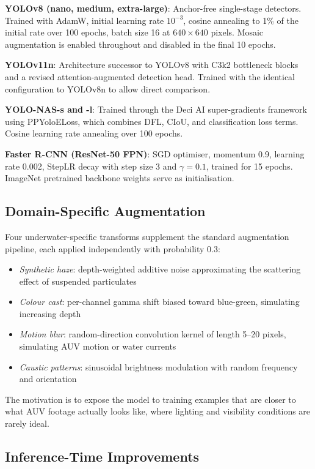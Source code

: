 \documentclass[conference]{IEEEtran}
\begin{document}
\textbf{YOLOv8 (nano, medium, extra-large)}: Anchor-free single-stage
detectors. Trained with AdamW, initial learning rate $10^{-3}$, cosine
annealing to 1\% of the initial rate over 100 epochs, batch size 16 at
$640 \times 640$ pixels. Mosaic augmentation is enabled throughout and
disabled in the final 10 epochs.

\textbf{YOLOv11n}: Architecture successor to YOLOv8 with C3k2 bottleneck
blocks and a revised attention-augmented detection head. Trained with the
identical configuration to YOLOv8n to allow direct comparison.

\textbf{YOLO-NAS-s and -l}: Trained through the Deci AI super-gradients
framework using PPYoloELoss, which combines DFL, CIoU, and classification
loss terms. Cosine learning rate annealing over 100 epochs.

\textbf{Faster R-CNN (ResNet-50 FPN)}: SGD optimiser, momentum 0.9,
learning rate 0.002, StepLR decay with step size 3 and $\gamma = 0.1$,
trained for 15 epochs. ImageNet pretrained backbone weights serve as
initialisation.

\subsection{Domain-Specific Augmentation}

Four underwater-specific transforms supplement the standard augmentation
pipeline, each applied independently with probability 0.3:

\begin{itemize}
    \item \textit{Synthetic haze}: depth-weighted additive noise
          approximating the scattering effect of suspended particulates
    \item \textit{Colour cast}: per-channel gamma shift biased toward
          blue-green, simulating increasing depth
    \item \textit{Motion blur}: random-direction convolution kernel of
          length 5--20 pixels, simulating AUV motion or water currents
    \item \textit{Caustic patterns}: sinusoidal brightness modulation with
          random frequency and orientation
\end{itemize}

The motivation is to expose the model to training examples that are closer
to what AUV footage actually looks like, where lighting and visibility
conditions are rarely ideal.

\subsection{Inference-Time Improvements}
\end{document}
